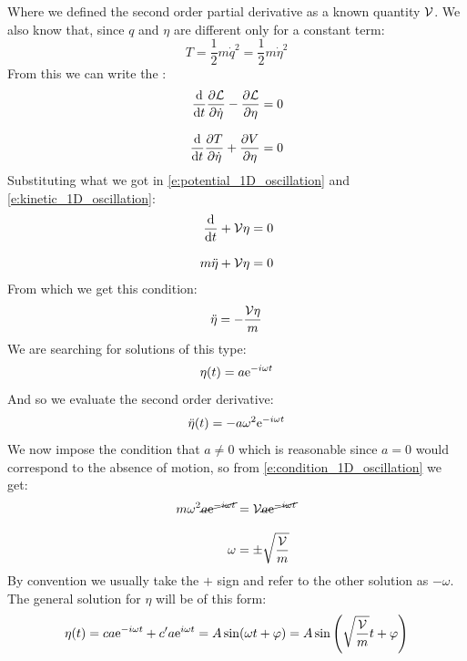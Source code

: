 Where we defined the second order partial derivative as a known quantity $\mathcal{V}$. We also know that, since $q$ and $\eta$ are different only for a constant term:
\begin{equation} \label{e:kinetic_1D_oscillation}
    T = \dfrac{1}{2}m\dot{q}^2 = \dfrac{1}{2}m\dot{\eta}^2
\end{equation}
From this we can write the \eleref :
\begin{equation}
    \begin{split}
        \dv{}{t}\pdv{\lagr}{\dot{\eta}} -\pdv{\lagr}{\eta} = 0 \\[8pt]
        \dv{}{t}\pdv{T}{\dot{\eta}} + \pdv{V}{\eta} = 0
    \end{split}
\end{equation}
Substituting what we got in \eqref{e:potential_1D_oscillation} and \eqref{e:kinetic_1D_oscillation}:
\begin{equation}
    \begin{split}
        \dv{}{t}(m\dot{\eta}) + \Velegant\eta &= 0\\[8pt]
        m\ddot{\eta} + \Velegant\eta &= 0
    \end{split}
\end{equation}
From which we get this condition:
\begin{equation} \label{e:condition_1D_oscillation}
    \ddot{\eta} =- \dfrac{\mathcal{V}\eta}{m}
\end{equation}
We are searching for solutions of this type:
\begin{equation}
    \eta (t) = a\mathrm{e}^{-i\omega t}
\end{equation}
And so we evaluate the second order derivative:
\begin{eqnarray}
    \ddot{\eta} (t) = -a\omega^2\mathrm{e}^{-i\omega t}
\end{eqnarray}
We now impose the condition that $a\neq 0$ which is reasonable since $a=0$ would correspond to the absence of motion, so from \eqref{e:condition_1D_oscillation} we get:
\begin{equation}
    \begin{split}
        m\omega^2\cancel{a\mathrm{e}^{-i\omega t}} &= \mathcal{V}\cancel{a\mathrm{e}^{-i\omega t}}\\[8pt]
        \omega &= \pm \sqrt{\dfrac{\mathcal{V}}{m}}
    \end{split}
\end{equation}
By convention we usually take the $+$ sign and refer to the other solution as $-\omega$. The general solution for $\eta$ will be of this form:
\begin{equation}
    \eta (t) = ca\mathrm{e}^{-i\omega t} + c'a\mathrm{e}^{i\omega t} = A \sin(\omega t + \varphi) = A \sin\left(\sqrt{\dfrac{\mathcal{V}}{m}} t + \varphi\right)
\end{equation}
